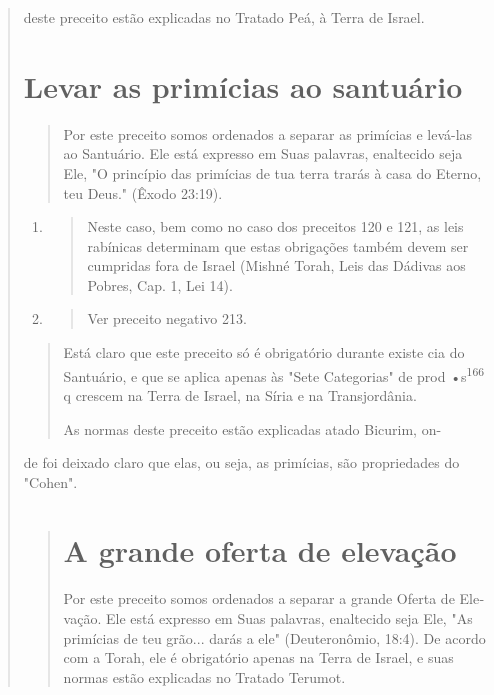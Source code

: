 \begin{quote}
deste preceito estão explicadas no Tratado Peá, à Terra de Israel.

\section{Levar as primícias ao santuário}

\begin{quote}
Por este preceito somos ordenados a separar as primícias e levá-las ao
Santuário. Ele está expresso em Suas palavras, enaltecido seja Ele, "O
princí­pio das primícias de tua terra trarás à casa do Eterno, teu
Deus." (Êxodo 23:19).
\end{quote}

\begin{enumerate}
\def\labelenumi{\arabic{enumi}.}
\setcounter{enumi}{163}
\item
 \begin{quote}
 Neste caso, bem como no caso dos preceitos 120 e 121, as leis
 rabínicas determinam que estas obrigações também devem ser cumpridas
 fora de Israel (Mishné Torah, Leis das Dádivas aos Po­bres, Cap. 1,
 Lei 14).
 \end{quote}
\item
 \begin{quote}
 Ver preceito negativo 213.
 \end{quote}
\end{enumerate}

\begin{quote}


Está claro que este preceito só é obrigatório durante existe cia do
Santuário, e que se aplica apenas às "Sete Categorias" de prod
•s\textsuperscript{166} q crescem na Ter­ra de Israel, na Síria e na
Transjordânia.

As normas deste preceito estão explicadas atado Bicurim, on-
\end{quote}

de foi deixado claro que elas, ou seja, as primícias, são propriedades
do "Cohen".

\begin{quote}
\section{A grande oferta de elevação}

Por este preceito somos ordenados a separar a grande Oferta de
Ele­vação. Ele está expresso em Suas palavras, enaltecido seja Ele, "As
primícias de teu grão... darás a ele" (Deuteronômio, 18:4). De acordo
com a Torah, ele é obrigatório apenas na Terra de Israel, e suas normas
estão explicadas no Tra­tado Terumot.


\end{quote}
\end{quote}
